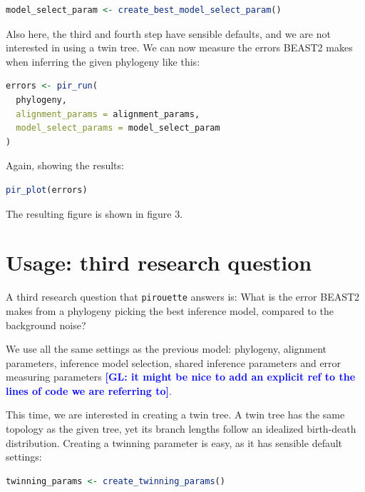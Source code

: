 \documentclass{article}
\newcommand{\giovanni}[1]{\textcolor{blue}{\textbf{[GL: #1]}}}
\begin{document}
\begin{lstlisting}[language=R, floatplacement=H]
model_select_param <- create_best_model_select_param()
\end{lstlisting}

Also here, the third and fourth step have sensible defaults, and we are not
interested in using a twin tree. We can now measure the errors BEAST2
makes when inferring the given phylogeny like this:

\begin{lstlisting}[language=R, floatplacement=H]
errors <- pir_run(
  phylogeny,
  alignment_params = alignment_params,
  model_select_params = model_select_param
)
\end{lstlisting}

Again, showing the results:

\begin{lstlisting}[language=R, floatplacement=H]
pir_plot(errors)
\end{lstlisting}

The resulting figure is shown in figure 3.

\section{Usage: third research question}

A third research question that \verb;pirouette; answers is:
What is the error BEAST2 makes from a phylogeny 
picking the best inference model, compared to the background noise?

We use all the same settings as the previous model:
phylogeny, alignment parameters, inference model selection,
shared inference parameters and error measuring parameters \giovanni{it might be nice to add an explicit ref to the lines of code we are referring to}.  

This time, we are interested in creating a twin tree. A twin tree
has the same topology as the given tree, yet its branch lengths follow
an idealized birth-death distribution. Creating a twinning parameter is easy,
as it has sensible default settings:

\begin{lstlisting}[language=R, floatplacement=H]
twinning_params <- create_twinning_params()
\end{lstlisting}
\end{document}
